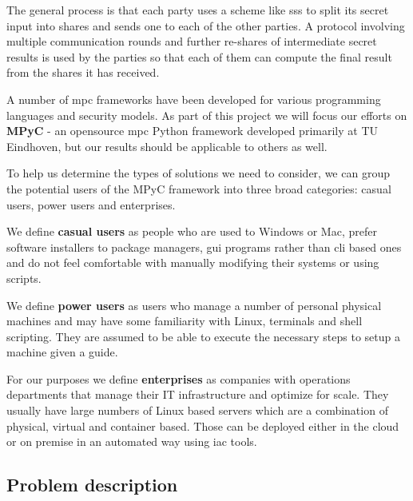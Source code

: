 \documentclass[
]{article}
\begin{document}
The general process is that each party uses a scheme like \gls{sss}
\autocite{shamirHowShareSecret1979} to split its secret input into
shares and sends one to each of the other parties. A protocol involving
multiple communication rounds and further re-shares of intermediate
secret results is used by the parties so that each of them can compute
the final result from the shares it has received.

A number of \gls{mpc} frameworks have been developed for various
programming languages and security models. As part of this project we
will focus our efforts on \textbf{MPyC}\autocite{mpycHome,mpycSource} -
an opensource \gls{mpc} Python framework developed primarily at TU
Eindhoven, but our results should be applicable to others as well.

To help us determine the types of solutions we need to consider, we can
group the potential users of the MPyC framework into three broad
categories: casual users, power users and enterprises.

We define \textbf{casual users} as people who are used to Windows or
Mac, prefer software installers to package managers, \gls{gui} programs
rather than \gls{cli} based ones and do not feel comfortable with
manually modifying their systems or using scripts.

We define \textbf{power users} as users who manage a number of personal
physical machines and may have some familiarity with Linux, terminals
and shell scripting. They are assumed to be able to execute the
necessary steps to setup a machine given a guide.

For our purposes we define \textbf{enterprises} as companies with
operations departments that manage their IT infrastructure and optimize
for scale. They usually have large numbers of Linux based servers which
are a combination of physical, virtual and container based. Those can be
deployed either in the cloud or on premise in an automated way using
\gls{iac} tools.

\hypertarget{problem-description}{%
  \subsection{Problem description}\label{problem-description}}
\end{document}
